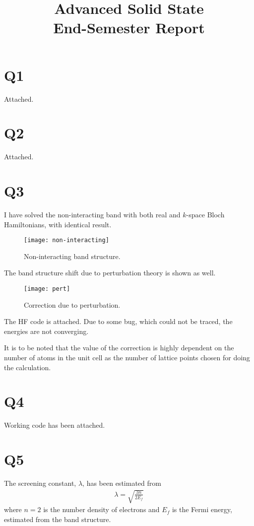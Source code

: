 \documentclass[]{report}
\title{Advanced Solid State\\
End-Semester Report}
\author{}
\begin{document}
\maketitle

\section{Q1}
Attached.

\section{Q2}
Attached.

\section{Q3}
I have solved the non-interacting band with both real and $k$-space Bloch Hamiltonians, with identical result.
\begin{figure}[h!]
	\centering
	\texttt{[image: non-interacting]}
	\caption{Non-interacting band structure.}
	\label{fig:non-interacting}
\end{figure}

The band structure shift due to perturbation theory is shown as well.

\begin{figure}[h!]
	\centering
	\texttt{[image: pert]}
	\caption{Correction due to perturbation.}
	\label{fig:pert}
\end{figure}

The HF code is attached. Due to some bug, which could not be traced, the energies are not converging.

It is to be noted that the value of the correction is highly dependent on the number of atoms in the unit cell as the number of lattice points chosen for doing the calculation.

\section{Q4}
Working code has been attached.

\section{Q5}
The screening constant, $\lambda$, has been estimated from
\begin{align}
\lambda = \sqrt{\frac{3n}{2 E_f}}
\end{align}
where $n=2$ is the number density of electrons and $E_f$ is the Fermi energy, estimated from the band structure.
\end{document}
